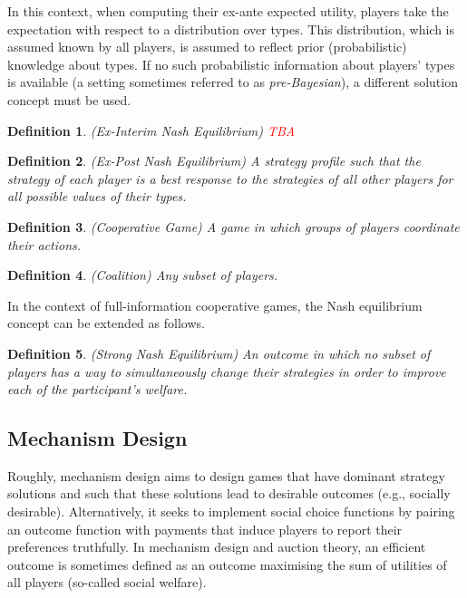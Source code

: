 \documentclass{article}
\newtheorem{definition}{Definition}
\begin{document}
In this context, when computing their ex-ante expected utility, players take the expectation with respect to a distribution over types. This distribution, which is assumed known by all players, is assumed to reflect prior (probabilistic) knowledge about types. If no such probabilistic information about players' types is available (a setting sometimes referred to as \textit{pre-Bayesian}), a different solution concept must be used. 


\begin{definition}
(Ex-Interim Nash Equilibrium) \textcolor{red}{TBA}
\end{definition}

\begin{definition}
(Ex-Post Nash Equilibrium) A strategy profile such that the strategy of each player is a best response to the strategies of all other players for all possible values of their types.
\end{definition}

\begin{definition}
(Cooperative Game) A game in which groups of players coordinate their actions.
\end{definition}

\begin{definition}
(Coalition) Any subset of players.
\end{definition}

In the context of full-information cooperative games, the Nash equilibrium concept can be extended as follows.

\begin{definition}
(Strong Nash Equilibrium) An outcome in which no subset of players has a way to simultaneously change their strategies in order to improve each of the participant's welfare.
\end{definition}

\subsection{Mechanism Design}

Roughly, mechanism design aims to design games that have dominant strategy solutions and such that these solutions lead to desirable outcomes (e.g., socially desirable). Alternatively, it seeks to implement social choice functions by pairing an outcome function with payments that induce players to report their preferences truthfully. In mechanism design and auction theory, an efficient outcome is sometimes defined as an outcome maximising the sum of utilities of all players (so-called social welfare).
\end{document}
